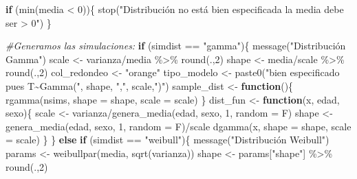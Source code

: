 \documentclass[
]{article}
\newenvironment{Shaded}{\begin{snugshade}}{\end{snugshade}}
\newcommand{\AttributeTok}[1]{\textcolor[rgb]{0.77,0.63,0.00}{#1}}
\newcommand{\CommentTok}[1]{\textcolor[rgb]{0.56,0.35,0.01}{\textit{#1}}}
\newcommand{\ControlFlowTok}[1]{\textcolor[rgb]{0.13,0.29,0.53}{\textbf{#1}}}
\newcommand{\DecValTok}[1]{\textcolor[rgb]{0.00,0.00,0.81}{#1}}
\newcommand{\FunctionTok}[1]{\textcolor[rgb]{0.00,0.00,0.00}{#1}}
\newcommand{\NormalTok}[1]{#1}
\newcommand{\OtherTok}[1]{\textcolor[rgb]{0.56,0.35,0.01}{#1}}
\newcommand{\SpecialCharTok}[1]{\textcolor[rgb]{0.00,0.00,0.00}{#1}}
\newcommand{\StringTok}[1]{\textcolor[rgb]{0.31,0.60,0.02}{#1}}
\begin{document}
\begin{Shaded}
\begin{Highlighting}[]
\ControlFlowTok{if}\NormalTok{ (}\FunctionTok{min}\NormalTok{(media }\SpecialCharTok{\textless{}} \DecValTok{0}\NormalTok{))\{}
  \FunctionTok{stop}\NormalTok{(}\StringTok{"Distribución no está bien especificada la media debe ser \textgreater{} 0"}\NormalTok{)}
\NormalTok{\}}

\CommentTok{\#Generamos las simulaciones:}
\ControlFlowTok{if}\NormalTok{ (simdist }\SpecialCharTok{==} \StringTok{"gamma"}\NormalTok{)\{}
  \FunctionTok{message}\NormalTok{(}\StringTok{"Distribución Gamma"}\NormalTok{)}
\NormalTok{  scale        }\OtherTok{\textless{}{-}}\NormalTok{ varianza}\SpecialCharTok{/}\NormalTok{media  }\SpecialCharTok{\%\textgreater{}\%} \FunctionTok{round}\NormalTok{(.,}\DecValTok{2}\NormalTok{)}
\NormalTok{  shape        }\OtherTok{\textless{}{-}}\NormalTok{ media}\SpecialCharTok{/}\NormalTok{scale     }\SpecialCharTok{\%\textgreater{}\%} \FunctionTok{round}\NormalTok{(.,}\DecValTok{2}\NormalTok{)}
\NormalTok{  col\_redondeo }\OtherTok{\textless{}{-}} \StringTok{"orange"}
\NormalTok{  tipo\_modelo  }\OtherTok{\textless{}{-}} \FunctionTok{paste0}\NormalTok{(}\StringTok{"bien especificado pues T\textasciitilde{}Gamma("}\NormalTok{, }
\NormalTok{                         shape, }\StringTok{","}\NormalTok{, scale,}\StringTok{")"}\NormalTok{)}
\NormalTok{  sample\_dist  }\OtherTok{\textless{}{-}} \ControlFlowTok{function}\NormalTok{()\{}
    \FunctionTok{rgamma}\NormalTok{(nsims, }\AttributeTok{shape =}\NormalTok{ shape, }\AttributeTok{scale =}\NormalTok{ scale)}
\NormalTok{  \}}
\NormalTok{  dist\_fun     }\OtherTok{\textless{}{-}} \ControlFlowTok{function}\NormalTok{(x, edad, sexo)\{}
\NormalTok{    scale }\OtherTok{\textless{}{-}}\NormalTok{ varianza}\SpecialCharTok{/}\FunctionTok{genera\_media}\NormalTok{(edad, sexo, }\DecValTok{1}\NormalTok{, }\AttributeTok{random =}\NormalTok{ F) }
\NormalTok{    shape }\OtherTok{\textless{}{-}} \FunctionTok{genera\_media}\NormalTok{(edad, sexo, }\DecValTok{1}\NormalTok{, }\AttributeTok{random =}\NormalTok{ F)}\SpecialCharTok{/}\NormalTok{scale}
    \FunctionTok{dgamma}\NormalTok{(x, }\AttributeTok{shape =}\NormalTok{ shape, }\AttributeTok{scale =}\NormalTok{ scale)}
\NormalTok{  \}}
\NormalTok{\} }\ControlFlowTok{else} \ControlFlowTok{if}\NormalTok{ (simdist }\SpecialCharTok{==} \StringTok{"weibull"}\NormalTok{)\{}
  \FunctionTok{message}\NormalTok{(}\StringTok{"Distribución Weibull"}\NormalTok{)}
\NormalTok{  params       }\OtherTok{\textless{}{-}} \FunctionTok{weibullpar}\NormalTok{(media, }\FunctionTok{sqrt}\NormalTok{(varianza))}
\NormalTok{  shape        }\OtherTok{\textless{}{-}}\NormalTok{ params[}\StringTok{"shape"}\NormalTok{]  }\SpecialCharTok{\%\textgreater{}\%} \FunctionTok{round}\NormalTok{(.,}\DecValTok{2}\NormalTok{)}

\end{Highlighting}
\end{Shaded}
\end{document}
